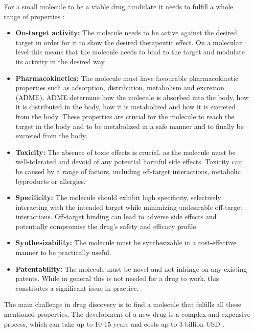 For a small molecule to be a viable drug candidate it needs to fulfill a whole range of properties \citep{todo}:
\begin{itemize}
      \item \textbf{On-target activity:} The molecule needs to be active against the desired target in
            order for it to show the desired therapeutic effect. On a molecular level this means that the
            molecule needs to bind to the target and modulate its activity in the desired way.
      \item \textbf{Pharmacokinetics:} The molecule must have favourable pharmacokinetic properties
            such as adsorption, distribution, metabolism and excretion (ADME). ADME determine how the
            molecule is absorbed into the body, how it is distributed in the body, how it is metabolized and
            how it is excreted from the body. These properties are crucial for the molecule to reach the
            target in the body and to be metabolized in a safe manner and to finally be excreted from the
            body.
      \item \textbf{Toxicity:}  The absence of toxic effects is crucial, as the molecule must be
            well-tolerated and devoid of any potential harmful side effects. Toxicity can be caused by a
            range of factors, including off-target interactions, metabolic byproducts or allergies.
      \item \textbf{Specificity:}  The molecule should exhibit high specificity, selectively
            interacting with the intended target while minimizing undesirable off-target interactions.
            Off-target binding can lead to adverse side effects and potentially compromise the drug's safety
            and efficacy profile.
      \item \textbf{Synthesizability:} The molecule must be synthesizable in a cost-effective manner to be
            practically useful.
      \item \textbf{Patentability:} The molecule must be novel and not infringe on any existing
            patents. While in general this is not needed for a drug to work, this constitutes a significant
            issue in practice.
\end{itemize}

The main challenge in drug discovery is to find a molecule that fulfills all these mentioned
properties. The development of a new drug is a complex and expensive process, which can take up to
10-15 years and costs up to 3 billion USD \citep{todo}.


